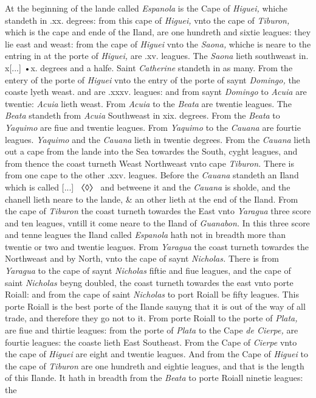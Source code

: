 \documentclass[11pt,twoside]{article}\makeatletter
\def\gap{}
\begin{document}
	\normalmarginpar
       At the beginning of the lande called {\itshape Espanola} is the Cape of {\itshape Higuei,} whiche standeth in .xx. degrees: from this cape of {\itshape Higuei,} vnto the cape of {\itshape Tiburon,} which is the cape and ende of the Iland, are one hundreth and sixtie leagues: they lie east and weast: from the cape of {\itshape Higuei} vnto the {\itshape Saona,} whiche is neare to the entring in at the porte of {\itshape Higuei,} are .xv. lea­gues. 
	\normalmarginpar
       The {\itshape Saona} lieth southweast in. x[...] {\gap •}x. degrees and a halfe. %
 Saint {\itshape Catherine} standeth in as many. From the entery of the porte of {\itshape Higuei} vnto the entry of the porte of saynt {\itshape Domingo,} the coaste lyeth weast. and are .xxxv. leagues: and from saynt {\itshape Domingo} to {\itshape Acuia} are twentie: {\itshape Acuia} lieth weast. From 
	\normalmarginpar
       {\itshape Acuia} to the {\itshape Beata} are twentie leagues. The {\itshape Beata} standeth from {\itshape Acuia} Southweast in xix. degrees. From the {\itshape Beata} to {\itshape Yaquimo} are fiue and twentie leagues. From {\itshape Yaquimo} to the {\itshape Cauana} are fourtie leagues. {\itshape Yaquimo} and the {\itshape Cauana} lieth in twentie degrees. From the {\itshape Cauana} lieth out a cape from the lande into the Sea towardes the South, cyght leagues, and from thence the coast turneth Weast Northweast vnto cape {\itshape Tiburon.} There is from one cape to the other .xxv. leagues. Before the {\itshape Cauana} standeth an Iland which is called [...] {\gap 〈◊〉} and betweene it and the {\itshape Cauana} is sholde, and the chanell li­eth neare to the lande, \& an other lieth at the end of the Iland. From the cape of {\itshape Tiburon} the coast turneth towardes the East vnto {\itshape Yaragua} three score and ten leagues, vntill it come neare to the Iland of {\itshape Guanabon.} In this three score and tenne leagues the Iland called {\itshape Espanola} hath not in breadth more than twentie or two and twentie leagues. From {\itshape Yaragua} the coast turneth towardes the Northweast and by North, vnto the cape of saynt {\itshape Nicholas.} There is from {\itshape Yaragua} to the cape of saynt {\itshape Nicholas} fiftie and fiue leagues, and the cape of saint {\itshape Nicholas} beyng doubled, the coast turneth towardes the east vnto porte Roiall: and from the cape of saint {\itshape Nicholas} to port Roiall be fifty leagues. This porte Roiall is the best porte of the Ilande sauyng that it is out of the way of all trade, and therefore they go not to it. From porte Roiall to the porte of {\itshape Plata,} are fiue and thirtie leagues: from the porte of {\itshape Plata} to the Cape {\itshape de Cierpe,} are fourtie leagues: the coaste lieth East Southeast. From the Cape of {\itshape Cierpe} vnto the cape of {\itshape Hi­guei} are eight and twentie leagues. And from the Cape of {\itshape Higuei} to the cape of {\itshape Tiburon} are one hundreth and eightie leagues, and that is the length of this Ilande. It hath in breadth from the {\itshape Beata} to porte Roiall ninetie leagues: the %
\end{document}
